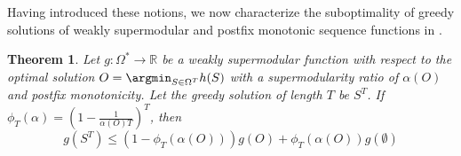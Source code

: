 \documentclass{article} %
\newtheorem{theorem}{Theorem}[section]
\begin{document}


Having introduced these notions, we now characterize the suboptimality of greedy solutions of weakly supermodular and 
postfix monotonic sequence functions in .
\begin{theorem} \label{th:suboptgreedy}
    Let $g: \Omega^* \to \mathbb{R}$ be a weakly supermodular function with respect to the optimal solution $O = \argmin_{S \in \Omega^T} h(S)$ with a supermodularity ratio of $\alpha(O)$ and 
    postfix monotonicity. Let the greedy solution of length $T$ be $S^T$. If $\phi_T(\alpha) =  \left(1 - \frac{1}{\alpha(O) T}\right)^T$, then
    \begin{equation*}
        g(S^T) \leq  \left(1 - \phi_T(\alpha(O))\right)
        g(O) +  \phi_T(\alpha(O))g(\emptyset)
    \end{equation*}
\end{theorem}
\end{document}
